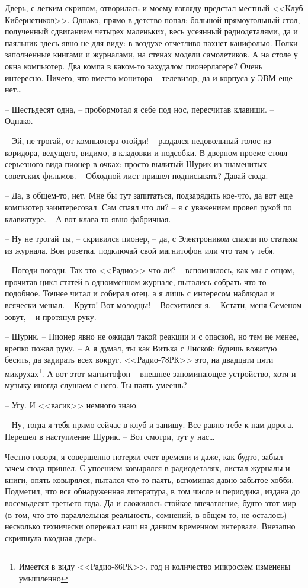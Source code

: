 \documentclass[a4paper]{book}
\begin{document}
Дверь, с легким скрипом, отворилась и моему взгляду предстал местный <<Клуб Кибернетиков>>. Однако, прямо в детство попал: большой прямоугольный стол, полученный сдвиганием четырех маленьких, весь усеянный радиодеталями, да и паяльник здесь явно не для виду: в воздухе отчетливо пахнет канифолью. Полки заполненные книгами и журналами, на стенах модели самолетиков. А на столе у окна компьютер. Два компа в каком-то захудалом пионерлагере? Очень интересно. Ничего, что вместо монитора -- телевизор, да и корпуса у ЭВМ еще нет\ldots 

-- Шестьдесят одна, -- пробормотал я себе под нос, пересчитав клавиши. -- Однако.

-- Эй, не трогай, от компьютера отойди! -- раздался недовольный голос из коридора, ведущего, видимо, в кладовки и подсобки. В дверном проеме стоял серьезного вида пионер в очках: просто вылитый Шурик из знаменитых советских фильмов. -- Обходной лист пришел подписывать? Давай сюда.

-- Да, в общем-то, нет. Мне бы тут запитаться, подзарядить кое-что, да вот еще компьютер заинтересовал. Сам спаял что ли? -- я с уважением провел рукой по клавиатуре. -- А вот клава-то явно фабричная.

-- Ну не трогай ты, -- скривился пионер, -- да, с Электроником спаяли по статьям из журнала. Вон розетка, подключай свой магнитофон или что там у тебя.

-- Погоди-погоди. Так это <<Радио>> что ли? -- вспомнилось, как мы с отцом, прочитав цикл статей в одноименном журнале, пытались собрать что-то подобное. Точнее читал и собирал отец, а я лишь с интересом наблюдал и всячески мешал. -- Круто! Вот молодцы! -- Восхитился я. -- Кстати, меня Семеном зовут, -- и протянул руку.

-- Шурик. -- Пионер явно не ожидал такой реакции и с опаской, но тем не менее, крепко пожал руку. -- А я думал, ты как Витька с Лиской: будешь вожатую бесить, да задирать всех вокруг. <<Радио-78РК>> это, на двадцати пяти микрухах\footnote{Имеется в виду <<Радио-86РК>>, год и количество микросхем изменены умышленно}. А вот этот магнитофон -- внешнее запоминающее устройство, хотя и музыку иногда слушаем с него. Ты паять умеешь? 

-- Угу. И <<васик>> немного знаю.

-- Ну, тогда я тебя прямо сейчас в клуб и запишу. Все равно тебе к нам дорога. -- Перешел в наступление Шурик. -- Вот смотри, тут у нас\ldots

Честно говоря, я совершенно потерял счет времени и даже, как будто, забыл зачем сюда пришел. С упоением ковырялся в радиодеталях, листал журналы и книги, опять ковырялся, пытался что-то паять, вспоминая давно забытое хобби. Подметил, что вся обнаруженная литература, в том числе и периодика, издана до восемьдесят третьего года. Да и сложилось стойкое впечатление, будто этот мир (в том, что это параллельная реальность, сомнений, в общем-то, не осталось) несколько технически опережал наш на данном временном интервале. Внезапно скрипнула входная дверь.
\end{document}
